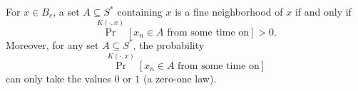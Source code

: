 For $x \in B_e$, a set $A \subseteq S^*$ containing $x$ is a fine neighborhood of $x$ if and only if
\[
\Pr^{K(\cdot, x)}\left[x_n \in A \text{ from some time on}\right] > 0.
\]
Moreover, for any set $A \subseteq S^*$, the probability
\[
\Pr^{K(\cdot, x)}\left[x_n \in A \text{ from some time on}\right]
\]
can only take the values $0$ or $1$ (a zero-one law).
